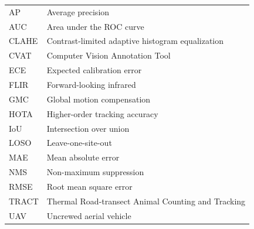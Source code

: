 \documentclass[pdflatex,sn-basic,Numbered]{sn-jnl}%
\theoremstyle{thmstyleone}
\begin{document}
\noindent
\begin{tabular}{@{}ll}
AP & Average precision\\
AUC & Area under the ROC curve\\
CLAHE & Contrast-limited adaptive histogram equalization\\
CVAT & Computer Vision Annotation Tool\\
ECE & Expected calibration error\\
FLIR & Forward-looking infrared\\
GMC & Global motion compensation\\
HOTA & Higher-order tracking accuracy\\
IoU & Intersection over union\\
LOSO & Leave-one-site-out\\
MAE & Mean absolute error\\
NMS & Non-maximum suppression\\
RMSE & Root mean square error\\
TRACT & Thermal Road-transect Animal Counting and Tracking\\
UAV & Uncrewed aerial vehicle
\end{tabular}

\begin{appendices}

\end{appendices}


\end{document}

